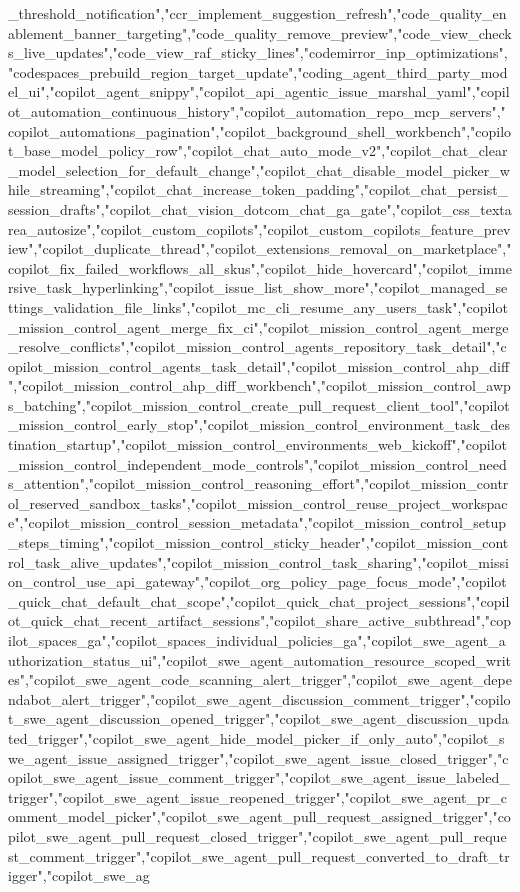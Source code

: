 {{{{{{{_threshold_notification","ccr_implement_suggestion_refresh","code_quality_enablement_banner_targeting","code_quality_remove_preview","code_view_checks_live_updates","code_view_raf_sticky_lines","codemirror_inp_optimizations","codespaces_prebuild_region_target_update","coding_agent_third_party_model_ui","copilot_agent_snippy","copilot_api_agentic_issue_marshal_yaml","copilot_automation_continuous_history","copilot_automation_repo_mcp_servers","copilot_automations_pagination","copilot_background_shell_workbench","copilot_base_model_policy_row","copilot_chat_auto_mode_v2","copilot_chat_clear_model_selection_for_default_change","copilot_chat_disable_model_picker_while_streaming","copilot_chat_increase_token_padding","copilot_chat_persist_session_drafts","copilot_chat_vision_dotcom_chat_ga_gate","copilot_css_textarea_autosize","copilot_custom_copilots","copilot_custom_copilots_feature_preview","copilot_duplicate_thread","copilot_extensions_removal_on_marketplace","copilot_fix_failed_workflows_all_skus","copilot_hide_hovercard","copilot_immersive_task_hyperlinking","copilot_issue_list_show_more","copilot_managed_settings_validation_file_links","copilot_mc_cli_resume_any_users_task","copilot_mission_control_agent_merge_fix_ci","copilot_mission_control_agent_merge_resolve_conflicts","copilot_mission_control_agents_repository_task_detail","copilot_mission_control_agents_task_detail","copilot_mission_control_ahp_diff","copilot_mission_control_ahp_diff_workbench","copilot_mission_control_awps_batching","copilot_mission_control_create_pull_request_client_tool","copilot_mission_control_early_stop","copilot_mission_control_environment_task_destination_startup","copilot_mission_control_environments_web_kickoff","copilot_mission_control_independent_mode_controls","copilot_mission_control_needs_attention","copilot_mission_control_reasoning_effort","copilot_mission_control_reserved_sandbox_tasks","copilot_mission_control_reuse_project_workspace","copilot_mission_control_session_metadata","copilot_mission_control_setup_steps_timing","copilot_mission_control_sticky_header","copilot_mission_control_task_alive_updates","copilot_mission_control_task_sharing","copilot_mission_control_use_api_gateway","copilot_org_policy_page_focus_mode","copilot_quick_chat_default_chat_scope","copilot_quick_chat_project_sessions","copilot_quick_chat_recent_artifact_sessions","copilot_share_active_subthread","copilot_spaces_ga","copilot_spaces_individual_policies_ga","copilot_swe_agent_authorization_status_ui","copilot_swe_agent_automation_resource_scoped_writes","copilot_swe_agent_code_scanning_alert_trigger","copilot_swe_agent_dependabot_alert_trigger","copilot_swe_agent_discussion_comment_trigger","copilot_swe_agent_discussion_opened_trigger","copilot_swe_agent_discussion_updated_trigger","copilot_swe_agent_hide_model_picker_if_only_auto","copilot_swe_agent_issue_assigned_trigger","copilot_swe_agent_issue_closed_trigger","copilot_swe_agent_issue_comment_trigger","copilot_swe_agent_issue_labeled_trigger","copilot_swe_agent_issue_reopened_trigger","copilot_swe_agent_pr_comment_model_picker","copilot_swe_agent_pull_request_assigned_trigger","copilot_swe_agent_pull_request_closed_trigger","copilot_swe_agent_pull_request_comment_trigger","copilot_swe_agent_pull_request_converted_to_draft_trigger","copilot_swe_ag}}}}}}}

